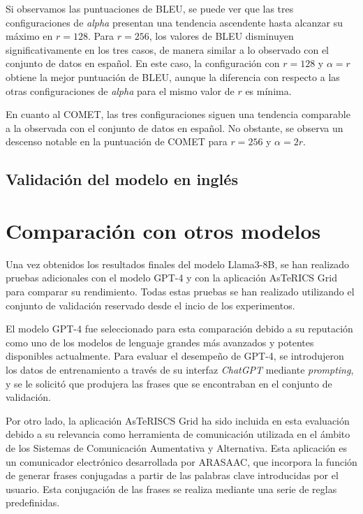 \documentclass[11pt,spanish,listoffigures,listoftables]{tfgetsinf}
\begin{document}
Si observamos las puntuaciones de BLEU, se puede ver que las tres configuraciones de \textit{alpha} presentan una tendencia ascendente hasta alcanzar su máximo en $r = 128$. Para $r = 256$, los valores de BLEU disminuyen significativamente en los tres casos, de manera similar a lo observado con el conjunto de datos en español. En este caso, la configuración con $r = 128$ y $\alpha = r$ obtiene la mejor puntuación de BLEU, aunque la diferencia con respecto a las otras configuraciones de \textit{alpha} para el mismo valor de $r$ es mínima.

En cuanto al COMET, las tres configuraciones siguen una tendencia comparable a la observada con el conjunto de datos en español. No obstante, se observa un descenso notable en la puntuación de COMET para $r = 256$ y $\alpha = 2r$.

\subsection{Validación del modelo en inglés}

\section{Comparación con otros modelos}

Una vez obtenidos los resultados finales del modelo Llama3-8B, se han realizado pruebas adicionales con el modelo GPT-4 y con la aplicación AsTeRICS Grid para comparar su rendimiento. Todas estas pruebas se han realizado utilizando el conjunto de validación reservado desde el incio de los experimentos.

El modelo GPT-4 fue seleccionado para esta comparación debido a su reputación como uno de los modelos de lenguaje grandes más avanzados y potentes disponibles actualmente. Para evaluar el desempeño de GPT-4, se introdujeron los datos de entrenamiento a través de su interfaz \textit{ChatGPT} mediante \textit{prompting}, y se le solicitó que produjera las frases que se encontraban en el conjunto de validación.

Por otro lado, la aplicación AsTeRISCS Grid ha sido incluida en esta evaluación debido a su relevancia como herramienta de comunicación utilizada en el ámbito de los Sistemas de Comunicación Aumentativa y Alternativa. Esta aplicación es un comunicador electrónico desarrollada por ARASAAC, que incorpora la función de generar frases conjugadas a partir de las palabras clave introducidas por el usuario. Esta conjugación de las frases se realiza mediante una serie de reglas predefinidas.
\end{document}

